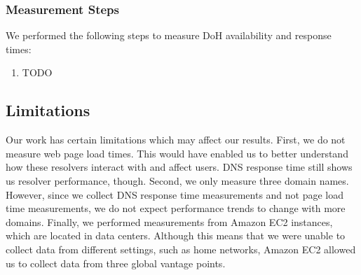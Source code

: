 \subsubsection{Measurement Steps}
We performed the following steps to measure DoH availability and response times:
\begin{enumerate}
    \item TODO
\end{enumerate}

\subsection{Limitations}
Our work has certain limitations which may affect our results. 
First, we do not measure web page load times. 
This would have enabled us to better understand how these resolvers interact with and affect users. 
DNS response time still shows us resolver performance, though. 
Second, we only measure three domain names. 
However, since we collect DNS response time measurements and not page load time measurements, we do not expect performance trends to change with more domains.
Finally, we performed measurements from Amazon EC2 instances, which are located in data centers. 
Although this means that we were unable to collect data from different settings, such as home networks, Amazon EC2 allowed us to collect data from three global vantage points. 
